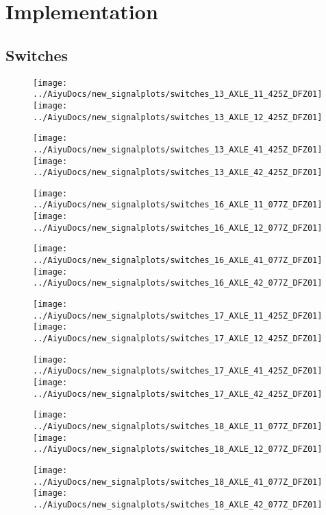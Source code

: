 \section{Implementation}
\subsection{Switches}
\begin{figure}[H]
	\centering
	\texttt{[image: ../AiyuDocs/new\_signalplots/switches\_13\_AXLE\_11\_425Z\_DFZ01]}
	\texttt{[image: ../AiyuDocs/new\_signalplots/switches\_13\_AXLE\_12\_425Z\_DFZ01]}
	
	\texttt{[image: ../AiyuDocs/new\_signalplots/switches\_13\_AXLE\_41\_425Z\_DFZ01]}
	\texttt{[image: ../AiyuDocs/new\_signalplots/switches\_13\_AXLE\_42\_425Z\_DFZ01]}
\end{figure}

\begin{figure}[H]
	\centering
	\texttt{[image: ../AiyuDocs/new\_signalplots/switches\_16\_AXLE\_11\_077Z\_DFZ01]}
	\texttt{[image: ../AiyuDocs/new\_signalplots/switches\_16\_AXLE\_12\_077Z\_DFZ01]}
	
	\texttt{[image: ../AiyuDocs/new\_signalplots/switches\_16\_AXLE\_41\_077Z\_DFZ01]}
	\texttt{[image: ../AiyuDocs/new\_signalplots/switches\_16\_AXLE\_42\_077Z\_DFZ01]}
\end{figure}

\begin{figure}[H]
	\centering
	\texttt{[image: ../AiyuDocs/new\_signalplots/switches\_17\_AXLE\_11\_425Z\_DFZ01]}
	\texttt{[image: ../AiyuDocs/new\_signalplots/switches\_17\_AXLE\_12\_425Z\_DFZ01]}
	
	\texttt{[image: ../AiyuDocs/new\_signalplots/switches\_17\_AXLE\_41\_425Z\_DFZ01]}
	\texttt{[image: ../AiyuDocs/new\_signalplots/switches\_17\_AXLE\_42\_425Z\_DFZ01]}
\end{figure}

\begin{figure}[H]
	\centering
	\texttt{[image: ../AiyuDocs/new\_signalplots/switches\_18\_AXLE\_11\_077Z\_DFZ01]}
	\texttt{[image: ../AiyuDocs/new\_signalplots/switches\_18\_AXLE\_12\_077Z\_DFZ01]}
	
	\texttt{[image: ../AiyuDocs/new\_signalplots/switches\_18\_AXLE\_41\_077Z\_DFZ01]}
	\texttt{[image: ../AiyuDocs/new\_signalplots/switches\_18\_AXLE\_42\_077Z\_DFZ01]}
\end{figure}

